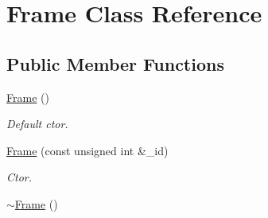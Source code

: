 \hypertarget{class_frame}{}\section{Frame Class Reference}
\label{class_frame}
\subsection*{Public Member Functions}
\begin{DoxyCompactItemize}
\item 
\hyperlink{class_frame_ad2e5946cf41d4817e750500acf05d02b}{Frame} ()\hypertarget{class_frame_ad2e5946cf41d4817e750500acf05d02b}{}\label{class_frame_ad2e5946cf41d4817e750500acf05d02b}

\begin{DoxyCompactList}\small\item\em Default ctor. \end{DoxyCompactList}\item 
\hyperlink{class_frame_a3aaef68e216ad9eb4f66a011e95ca79d}{Frame} (const unsigned int \&\+\_\+id)
\begin{DoxyCompactList}\small\item\em Ctor. \end{DoxyCompactList}\item 
\hyperlink{class_frame_abec8c7bccdfc88cb4da137caae9f73d6}{$\sim$\+Frame} ()\hypertarget{class_frame_abec8c7bccdfc88cb4da137caae9f73d6}{}\label{class_frame_abec8c7bccdfc88cb4da137caae9f73d6}


\end{DoxyCompactItemize}
